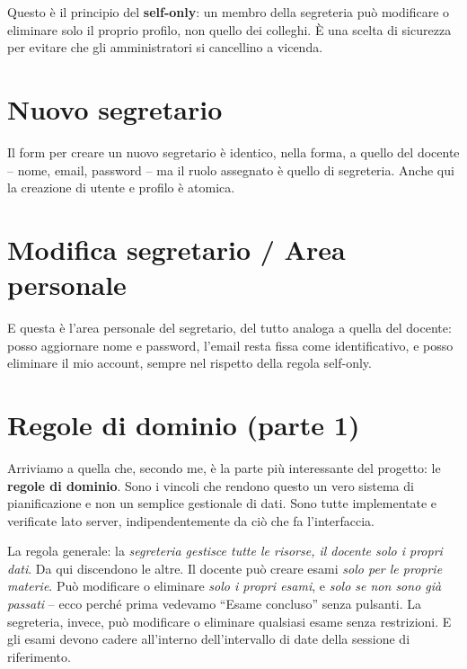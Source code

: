 \documentclass[11pt]{article}
\begin{document}
Questo è il principio del \textbf{self-only}: un membro della segreteria può modificare o
eliminare solo il proprio profilo, non quello dei colleghi. È una scelta di sicurezza
per evitare che gli amministratori si cancellino a vicenda.

\section*{Nuovo segretario}

Il form per creare un nuovo segretario è identico, nella forma, a quello del docente --
nome, email, password -- ma il ruolo assegnato è quello di segreteria. Anche qui la
creazione di utente e profilo è atomica.

\section*{Modifica segretario / Area personale}

E questa è l'area personale del segretario, del tutto analoga a quella del docente: posso
aggiornare nome e password, l'email resta fissa come identificativo, e posso eliminare il
mio account, sempre nel rispetto della regola self-only.

\section*{Regole di dominio (parte 1)}

Arriviamo a quella che, secondo me, è la parte più interessante del progetto: le
\textbf{regole di dominio}. Sono i vincoli che rendono questo un vero sistema di
pianificazione e non un semplice gestionale di dati. Sono tutte implementate e
verificate lato server, indipendentemente da ciò che fa l'interfaccia.

La regola generale: la \emph{segreteria gestisce tutte le risorse, il docente solo i
propri dati}. Da qui discendono le altre. Il docente può creare esami \emph{solo per le
proprie materie}. Può modificare o eliminare \emph{solo i propri esami}, e \emph{solo se
non sono già passati} -- ecco perché prima vedevamo ``Esame concluso'' senza pulsanti.
La segreteria, invece, può modificare o eliminare qualsiasi esame senza restrizioni.
E gli esami devono cadere all'interno dell'intervallo di date della sessione di
riferimento.
\end{document}
